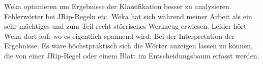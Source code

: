 Weka optimieren um Ergebnisse der Klassifikation besser zu analysieren. Fehlerwörter bei JRip-Regeln etc.
Weka hat sich während meiner Arbeit als ein sehr mächtiges und zum Teil recht störrisches Werkzeug erwiesen. Leider hört Weka dort auf, wo es eigentlich spannend wird: Bei der Interpretation der Ergebnisse. Es wäre höchstpraktisch sich die Wörter anzeigen lassen zu können, die von einer JRip-Regel oder einem Blatt im Entscheidungsbaum erfasst werden. 

